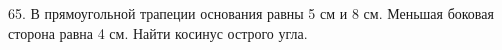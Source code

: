 65. В прямоугольной трапеции основания равны 5 см и 8 см. Меньшая боковая сторона равна 4 см. Найти косинус острого угла.\\
